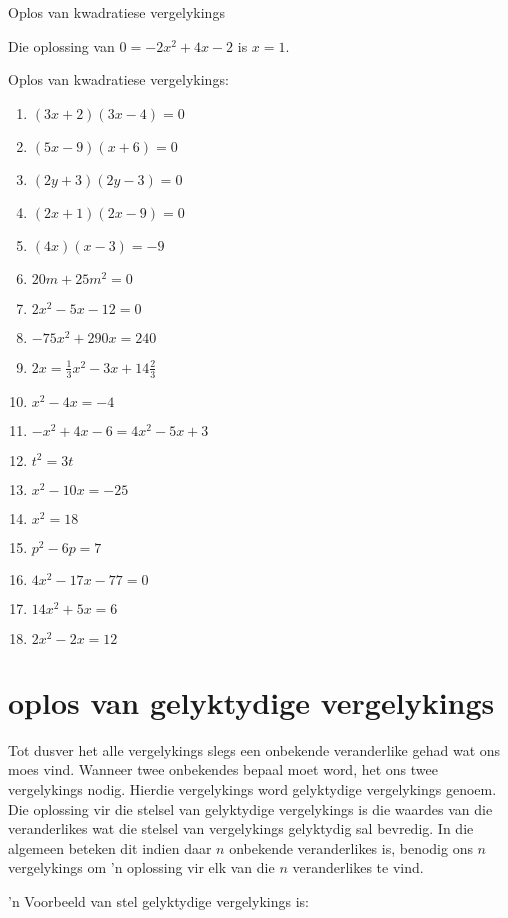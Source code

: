 \begin{aktiwiteit}{}
\begin{wex}{ Oplos van kwadratiese vergelykings }
{

 
Die oplossing van $0=-2{x}^{2}+4x-2$ is $x=1$.
}
\end{wex}


\begin{exercises}{ }
{
Oplos van kwadratiese vergelykings:
\begin{multicols}{2}
\begin{enumerate}[noitemsep, label=\textbf{\arabic*}. ] 
\item  $(3x+2)(3x-4)=0$
\item  $(5x-9)(x+6)=0$
\item  $(2y+3)(2y-3)=0$ 
\item  $(2x+1)(2x-9)=0$    
\item  $(4x)(x-3)=-9$       
\item  $20m+25{m}^{2}=0$
\item  $2{x}^{2}-5x-12=0$  
\item  $-75{x}^{2}+290x=240$
\item  $2x=\frac{1}{3}{x}^{2}-3x+14\frac{2}{3}$
\item  ${x}^{2}-4x=-4$      
\item  $-{x}^{2}+4x-6=4{x}^{2}-5x+3$       
\item  ${t}^{2}=3t$  
\item  ${x}^{2}-10x=-25$      
\item  ${x}^{2}=18$
\item  ${p}^{2}-6p=7$
\item  $4{x}^{2}-17x-77=0$
\item  $14{x}^{2}+5x=6$
\item  $2{x}^{2}-2x=12$              
\end{enumerate}
\end{multicols}

}
\end{exercises}


\section{oplos van gelyktydige vergelykings}


Tot dusver het alle vergelykings slegs een onbekende veranderlike gehad wat ons moes vind.
Wanneer twee onbekendes bepaal moet word, het ons twee vergelykings nodig. Hierdie vergelykings word gelyktydige vergelykings
genoem. Die oplossing vir die stelsel van gelyktydige vergelykings is die waardes van die veranderlikes wat die stelsel van vergelykings gelyktydig sal bevredig. In die algemeen beteken dit indien daar $n$ onbekende veranderlikes is, benodig ons $n$ vergelykings om ’n oplossing vir elk van die $n$ veranderlikes te vind.\par 
’n Voorbeeld van stel gelyktydige vergelykings is:


\end{aktiwiteit}
